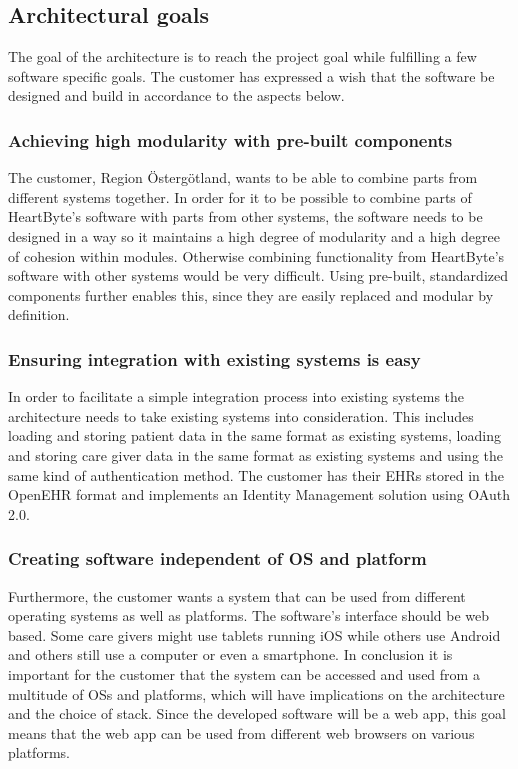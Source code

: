 \documentclass{article}
\begin{document}
\subsection{Architectural goals}
The goal of the architecture is to reach the project goal while fulfilling a few software specific goals. The customer has expressed a wish that the software be designed and build in accordance to the aspects below.

\subsubsection{Achieving high modularity with pre-built components}
The customer, Region Östergötland, wants to be able to combine parts from different systems together. In order for it to be possible to combine parts of HeartByte's software with parts from other systems, the software needs to be designed in a way so it maintains a high degree of modularity and a high degree of cohesion within modules. Otherwise combining functionality from HeartByte's software with other systems would be very difficult. Using pre-built, standardized components further enables this, since they are easily replaced and modular by definition.

\subsubsection{Ensuring integration with existing systems is easy}
In order to facilitate a simple integration process into existing systems the architecture needs to take existing systems into consideration. This includes loading and storing patient data in the same format as existing systems, loading and storing care giver data in the same format as existing systems and using the same kind of authentication method. The customer has their EHRs stored in the OpenEHR format and implements an Identity Management solution using OAuth 2.0.

\subsubsection{Creating software independent of OS and platform}
Furthermore, the customer wants a system that can be used from different operating systems as well as platforms. The software's interface should be web based. Some care givers might use tablets running iOS while others use Android and others still use a computer or even a smartphone. In conclusion it is important for the customer that the system can be accessed and used from a multitude of OSs and platforms, which will have implications on the architecture and the choice of stack. Since the developed software will be a web app, this goal means that the web app can be used from different web browsers on various platforms.
\end{document}
